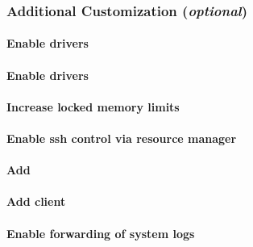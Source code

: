 \documentclass[letterpaper]{article}
\begin{document}

\subsubsection{Additional Customization ({\em optional})} \label{sec:addl_customizations}


\clearpage
\paragraph{Enable \InfiniBand{} drivers}


\paragraph{Enable \OmniPath{} drivers}


\paragraph{Increase locked memory limits}


\paragraph{Enable ssh control via resource manager} 


\paragraph{Add \beegfs{}} \label{sec:add_beegfs}


\paragraph{Add \Lustre{} client} \label{sec:lustre_client}

\vspace*{0.25cm}



\paragraph{Enable forwarding of system logs} \label{sec:add_syslog}

\end{document}
